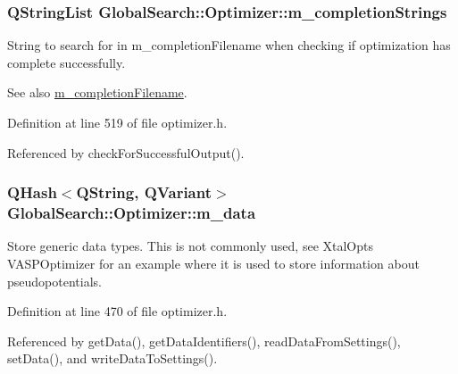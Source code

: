 \subsubsection[{m\+\_\+completion\+Strings}]{\setlength{\rightskip}{0pt plus 5cm}Q\+String\+List Global\+Search\+::\+Optimizer\+::m\+\_\+completion\+Strings\hspace{0.3cm}{\ttfamily [protected]}}\label{classGlobalSearch_1_1Optimizer_a65ee33ee8778c366e8b197e75ae8e674}
String to search for in m\+\_\+completion\+Filename when checking if optimization has complete successfully. \begin{DoxySeeAlso}{See also}
\hyperlink{classGlobalSearch_1_1Optimizer_a5e7a476823bc2d4b63939a9ada4f8ed0}{m\+\_\+completion\+Filename}. 
\end{DoxySeeAlso}


Definition at line 519 of file optimizer.\+h.



Referenced by check\+For\+Successful\+Output().

\hypertarget{classGlobalSearch_1_1Optimizer_a5cf732e34a6eaa4a7b1781d23e6e1c6e}{}
\subsubsection[{m\+\_\+data}]{\setlength{\rightskip}{0pt plus 5cm}Q\+Hash$<$Q\+String, Q\+Variant$>$ Global\+Search\+::\+Optimizer\+::m\+\_\+data\hspace{0.3cm}{\ttfamily [protected]}}\label{classGlobalSearch_1_1Optimizer_a5cf732e34a6eaa4a7b1781d23e6e1c6e}
Store generic data types. This is not commonly used, see Xtal\+Opt\textquotesingle{}s V\+A\+S\+P\+Optimizer for an example where it is used to store information about pseudopotentials. 

Definition at line 470 of file optimizer.\+h.



Referenced by get\+Data(), get\+Data\+Identifiers(), read\+Data\+From\+Settings(), set\+Data(), and write\+Data\+To\+Settings().

\hypertarget{classGlobalSearch_1_1Optimizer_a4d2dc8b7aaa3bb6fed8c28547460def8}{}
